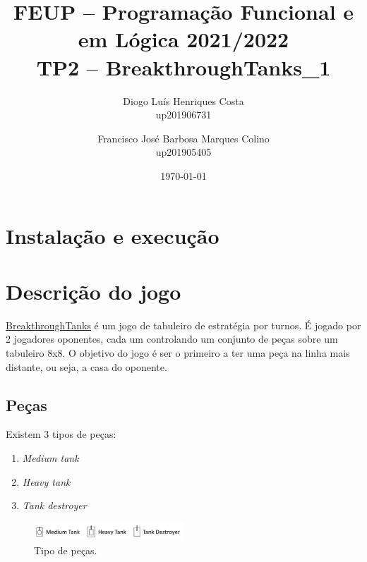 \documentclass[a4paper,11pt,portuguese]{article}
\begin{document}

\author{
    Diogo Luís Henriques Costa\\
    up201906731
    \and
    Francisco José Barbosa Marques Colino\\
    up201905405
}
\title{FEUP -- Programação Funcional e em Lógica \large 2021/2022 \\ \large TP2 -- BreakthroughTanks\_1}
\date{\today}
\maketitle


\section{Instalação e execução}



\section{Descrição do jogo}

\href{https://boardgamegeek.com/boardgame/321224/breakthrough-tanks}{BreakthroughTanks}
é um jogo de tabuleiro de estratégia por turnos. É jogado por 2 jogadores oponentes, cada 
um controlando um conjunto de peças sobre um tabuleiro 8x8. O objetivo do jogo é ser o primeiro
a ter uma peça na linha mais distante, ou seja, a casa do oponente. 

\subsection{Peças}

\noindent Existem 3 tipos de peças:

\begin{enumerate}[topsep=4pt,itemsep=2pt]
    \item \textit{Medium tank}
    \item \textit{Heavy tank}
    \item \textit{Tank destroyer}
\end{enumerate}

\begin{figure}[H]
    \centering
    \includegraphics[width=0.5\textwidth]{imgs/pecas.png}
    \caption{Tipo de peças.}
    \label{fig:pecas}
\end{figure}
\end{document}
